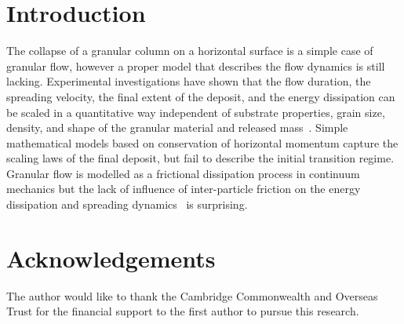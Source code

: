 \documentclass[epj,twocolumn]{webofc}
\begin{document}
\section{Introduction}
The collapse of a granular column on a horizontal surface is a simple case of granular flow, however a
proper model that describes the flow dynamics is still lacking. Experimental investigations have shown that
the flow duration, the spreading velocity, the final extent of the deposit, and the energy dissipation can be scaled in a quantitative way independent of substrate properties, grain size, density, and shape of the granular
material and released mass~\cite{Lajeunesse2005, Lube2005}. Simple mathematical models based on conservation of horizontal momentum capture the scaling laws of the final deposit, but fail to describe the initial transition regime. Granular flow is modelled as a frictional dissipation process in continuum mechanics but the lack of influence of inter-particle friction on the energy dissipation and spreading dynamics~\cite{Lube2005} is surprising.

\section*{Acknowledgements}
The author would like to thank the Cambridge Commonwealth and Overseas Trust for the financial support to the
first author to pursue this research.

%
% 
%
%
 
\end{document}

